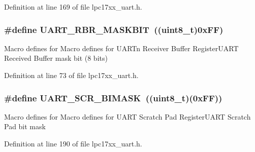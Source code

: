 Definition at line 169 of file lpc17xx\+\_\+uart.\+h.

\subsubsection[{\texorpdfstring{U\+A\+R\+T\+\_\+\+R\+B\+R\+\_\+\+M\+A\+S\+K\+B\+IT}{UART_RBR_MASKBIT}}]{\setlength{\rightskip}{0pt plus 5cm}\#define U\+A\+R\+T\+\_\+\+R\+B\+R\+\_\+\+M\+A\+S\+K\+B\+IT~(({\bf uint8\+\_\+t})0x\+F\+F)}\hypertarget{group___u_a_r_t___private___macros_ga06774e65c2ca095c4373122ed9a390b8}{}\label{group___u_a_r_t___private___macros_ga06774e65c2ca095c4373122ed9a390b8}
Macro defines for Macro defines for U\+A\+R\+Tn Receiver Buffer Register\+U\+A\+RT Received Buffer mask bit (8 bits) 

Definition at line 73 of file lpc17xx\+\_\+uart.\+h.

\subsubsection[{\texorpdfstring{U\+A\+R\+T\+\_\+\+S\+C\+R\+\_\+\+B\+I\+M\+A\+SK}{UART_SCR_BIMASK}}]{\setlength{\rightskip}{0pt plus 5cm}\#define U\+A\+R\+T\+\_\+\+S\+C\+R\+\_\+\+B\+I\+M\+A\+SK~(({\bf uint8\+\_\+t})(0x\+F\+F))}\hypertarget{group___u_a_r_t___private___macros_ga055f27dcd4a5664ffec09bf024e19120}{}\label{group___u_a_r_t___private___macros_ga055f27dcd4a5664ffec09bf024e19120}
Macro defines for Macro defines for U\+A\+RT Scratch Pad Register\+U\+A\+RT Scratch Pad bit mask 

Definition at line 190 of file lpc17xx\+\_\+uart.\+h.

